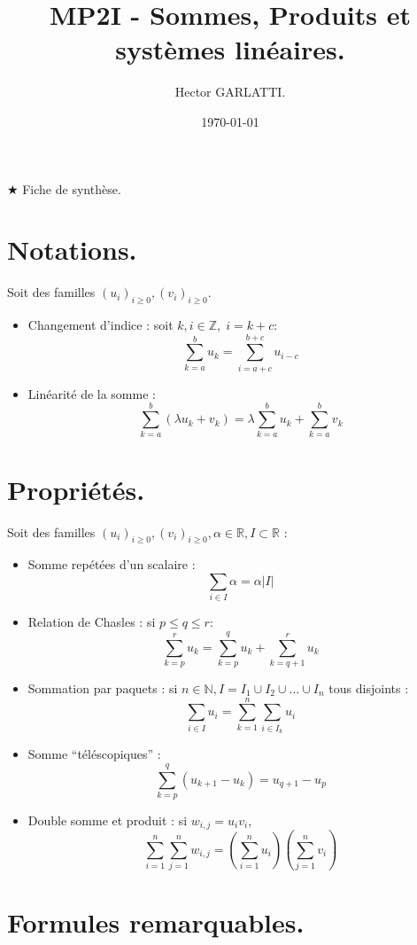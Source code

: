 \documentclass[12pt]{article}
\title{MP2I - Sommes, Produits et systèmes linéaires.}
\author{Hector GARLATTI.}
\date{\today{}}
\begin{document}
\maketitle

$\bigstar$ Fiche de synthèse.

\section{Notations.}

Soit des familles $(u_i)_{i \ge 0}, (v_i)_{i \ge 0}$.

\begin{itemize}
    \item Changement d'indice : soit $k, i \in \mathbb{Z}, \; i = k + c$:
$$
\sum_{k = a}^{b} u_k = \sum_{i = a + c}^{b + c} u_{i - c}
$$
    \item Linéarité de la somme : $$
\sum_{k=a}^{b} (\lambda u_k + v_k) = 
\lambda \sum_{k=a}^{b} u_k + \sum_{k=a}^{b} v_k
$$
\end{itemize}

\section{Propriétés.}

Soit des familles $(u_i)_{i \ge 0}, (v_i)_{i \ge 0}, 
\alpha \in \mathbb{R}, I \subset \mathbb{R}$  :

\begin{itemize}
    \item Somme repétées d'un scalaire : $$
\sum_{i \in I} \alpha = \alpha \vert I \vert
$$
    \item Relation de Chasles : si $p \le q \le r$: $$
\sum_{k=p}^{r} u_k = \sum_{k=p}^{q} u_k + \sum_{k=q+1}^{r} u_k   
$$
    \item Sommation par paquets : si $n \in \mathbb{N}, 
I = I_1 \cup I_2 \cup \dots \cup I_n$ tous disjoints : $$
\sum_{i \in I} u_i = \sum_{k=1}^{n} \sum_{i \in I_k} u_i
$$
    \item Somme \enquote{téléscopiques} : $$
\sum_{k=p}^{q} (u_{k+1} - u_k) = u_{q + 1} - u_p  
$$
    \item Double somme et produit : si $w_{i,j} = u_i v_i$, $$
\sum_{i=1}^{n} \sum_{j=1}^{n} w_{i, j} = 
\left(\sum_{i=1}^{n} u_i\right) \left(\sum_{j=1}^{n} v_i \right)     
$$
\end{itemize}

\section{Formules remarquables.}
\end{document}
